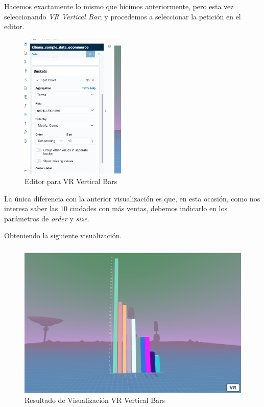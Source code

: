 \documentclass[a4paper, 12pt]{book}
\begin{document}
Hacemos exactamente lo mismo que hicimos anteriormente, pero esta vez seleccionando \textit{VR Vertical Bar}; y procedemos a seleccionar la petición en el editor.

\begin{figure}[H]
  \centering
  \includegraphics[width=5cm, keepaspectratio]{img/development/editor-bars.png}
  \caption{Editor para VR Vertical Bars}
  \label{fig:editorbars}
\end{figure}

La única diferencia con la anterior visualización es que, en esta ocasión, como nos interesa saber las 10 ciudades con más ventas, debemos indicarlo en los parámetros de \textit{order} y \textit{size}.

Obteniendo la siguiente visualización.

\begin{figure}[H]
  \centering
  \includegraphics[width=12cm, keepaspectratio]{img/development/visualizacion-bars-use.png}
  \caption{Resultado de Visualización VR Vertical Bars}
  \label{fig:visualizacionbarsuse}
\end{figure}
\end{document}
